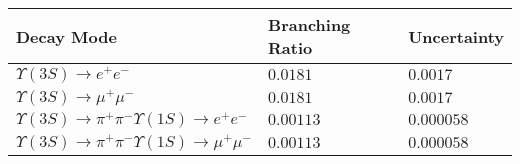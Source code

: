 \documentclass[12pt]{article}
\begin{document}
\pagebreak
\noindent \begin{tabular}{p{3.5 in} p{1.5 in} p{1 in}}
Decay Mode & Branching Ratio & Uncertainty \\\hline
$   \Upsilon(3S) \to e^+ e^-                                                                                           $ & $   0.0181      $ & $   0.0017     $ \\ 
$   \Upsilon(3S) \to \mu^+ \mu^-                                                                                       $ & $   0.0181      $ & $   0.0017     $ \\ 
$   \Upsilon(3S) \to \pi^+ \pi^- \Upsilon(1S) \to e^+ e^-                                                              $ & $   0.00113     $ & $   0.000058   $ \\ 
$   \Upsilon(3S) \to \pi^+ \pi^- \Upsilon(1S) \to \mu^+ \mu^-                                                          $ & $   0.00113     $ & $   0.000058   $
\end{tabular} \\
\end{document}
